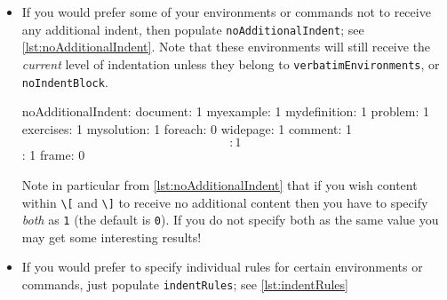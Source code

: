 \begin{itemize}
	\begin{yaml}[caption={\lstinline!noIndentBlock!},label={lst:noIndentBlock}]
noIndentBlock:
    noindent: 1
    cmhtest: 1
	\end{yaml}
												 		 		 		 		 					
	Of course, you don't want to have to specify these as null environments
	in your code, so you use them with a comment symbol, \lstinline!%!, followed 
	by as many spaces (possibly none) as you like; see \cref{lst:noIndentBlockdemo} for 
	example.
	\begin{lstlisting}[caption={\lstinline!noIndentBlock! demonstration},label={lst:noIndentBlockdemo},escapeinside={(*@}{@*)}]
%(*@@*) \begin{noindent} 
        this code
                won't 
     be touched
                    by 
             latexindent.pl!
%(*@@*)\end{noindent} 
	\end{lstlisting}
												 		 		 		 		 					
	\item[\verbitem{noAdditionalIndent}] If you would prefer some of your
	environments or commands not to receive any additional indent, then 
	populate \lstinline!noAdditionalIndent!; see \cref{lst:noAdditionalIndent}. 
	Note that these environments will still receive the \emph{current} level
	of indentation unless they belong to \lstinline!verbatimEnvironments!, or \lstinline!noIndentBlock!.
												 		 		 		 		 					
	\begin{yaml}[caption={\lstinline!noAdditionalIndent!},label={lst:noAdditionalIndent}]
noAdditionalIndent:
    document: 1
    myexample: 1
    mydefinition: 1
    problem: 1
    exercises: 1
    mysolution: 1
    foreach: 0
    widepage: 1
    comment: 1
    \[: 1
    \]: 1
    frame: 0
	\end{yaml}
	Note in particular from \cref{lst:noAdditionalIndent} that if you wish content within 
	\lstinline!\[!  and \lstinline!\]! to receive no additional content then 
	you have to specify \emph{both} as \lstinline!1! (the default is \lstinline!0!). 
	If you do not specify both as the same value you may get some interesting results!
	\item[\verbitem{indentRules}] If\label{page:indentRules} you would prefer to specify 
	individual rules for certain environments or commands, just
	populate \lstinline!indentRules!; see \cref{lst:indentRules}
												 		 		 		 		 					

\end{itemize}
